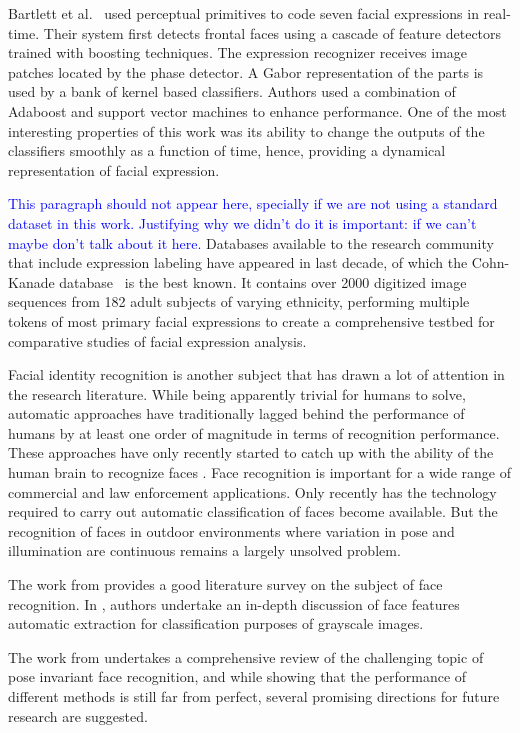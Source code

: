 \documentclass[]{article}
\begin{document}
Bartlett et al.~\cite{Bartlett4624313} used perceptual primitives to code seven facial expressions in real-time. Their system
first detects frontal faces using a cascade of feature detectors trained with boosting techniques. The expression
recognizer receives image patches located by the phase detector. A Gabor representation of the parts is used  by a bank
of kernel based classifiers. Authors used a combination of Adaboost and support vector machines to enhance performance.
One of the most interesting properties of this work was its ability to change the outputs of the classifiers smoothly
as a function of time, hence, providing a dynamical representation of facial expression.


\textcolor{blue}{This paragraph should not appear here, specially if
  we are not using a standard dataset in this work. Justifying why we
  didn't do it is important: if we can't maybe don't talk about it here.}
Databases available to the research community that include expression
labeling have appeared in last decade, of which the Cohn-Kanade
database~\cite{Cohn840611} is the best known. It contains over 2000
digitized image sequences from  182 adult subjects of varying
ethnicity, performing multiple tokens of most primary facial
expressions to create a comprehensive testbed for
comparative studies of facial expression analysis.


Facial identity recognition is another subject that has drawn a lot of attention in the research literature. While being
apparently trivial for humans to solve, automatic approaches have traditionally lagged behind the performance of humans
by at least one order of magnitude in terms of recognition performance. These approaches have only recently started to
catch up with the ability of the human brain to recognize faces \cite{onintelligence, Rozado2012b}. Face recognition is
important  for a wide range of commercial and law enforcement applications. Only recently has the technology required to
carry out automatic classification of faces become available. But the recognition of faces in outdoor environments 
where variation in pose and illumination are continuous remains a largely unsolved problem.

The work from \cite{Zhao:2003} provides a good literature survey on the subject of face recognition. In
\cite{Craw1987183}, authors undertake an in-depth discussion of face features automatic extraction for classification purposes of
grayscale images.

The work from \cite{Zhang20092876} undertakes a comprehensive review  of the challenging topic of pose invariant face
recognition, and while showing that the performance of different methods is still far from perfect, several promising
directions for future research  are suggested.
\end{document}
